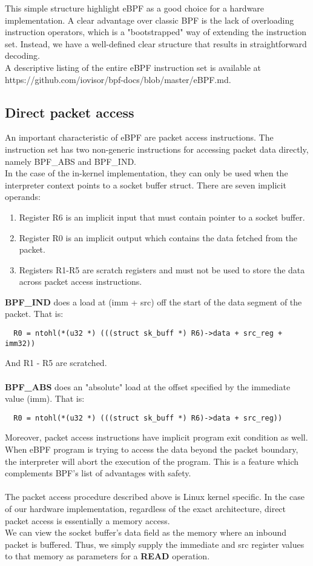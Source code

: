 \documentclass{l4proj}
\begin{document}
This simple structure highlight eBPF as a good choice for a hardware implementation. A clear advantage over classic BPF is the lack of overloading instruction operators, which is a "bootstrapped" way of extending the instruction set. Instead, we have a well-defined clear structure that results in straightforward decoding.\\
A descriptive listing of the entire eBPF instruction set is available at\\ https://github.com/iovisor/bpf-docs/blob/master/eBPF.md.\\

\subsection{Direct packet access}
An important characteristic of eBPF are packet access instructions. The instruction set has two non-generic instructions for accessing packet data directly, namely BPF\_ABS and BPF\_IND.\\
In the case of the in-kernel implementation, they can only be used when the interpreter context points to a socket buffer struct. There are seven implicit operands:
\begin{enumerate}
    \item Register R6 is an implicit input that must contain pointer to a socket buffer.
    \item Register R0 is an implicit output which contains the data fetched from the packet.
    \item Registers R1-R5 are scratch registers and must not be used to store the data across packet access instructions.
\end{enumerate}
\textbf{BPF\_IND} does a load at (imm + src) off the start of the data segment of the packet. That is:
\begin{lstlisting}
  R0 = ntohl(*(u32 *) (((struct sk_buff *) R6)->data + src_reg + imm32))
\end{lstlisting}
And R1 - R5 are scratched.\\\\
\textbf{BPF\_ABS} does an "absolute" load at the offset specified by the immediate value (imm). That is:
\begin{lstlisting}
  R0 = ntohl(*(u32 *) (((struct sk_buff *) R6)->data + src_reg))
\end{lstlisting}
Moreover, packet access instructions have implicit program exit condition as well. When eBPF program is trying to access the data beyond the packet boundary, the interpreter will abort the execution of the program. This is a feature which complements BPF's list of advantages with safety.\\\\
The packet access procedure described above is Linux kernel specific. In the case of our hardware implementation, regardless of the exact architecture, direct packet access is essentially a memory access.\\
We can view the socket buffer's data field as the memory where an inbound packet is buffered. Thus, we simply supply the immediate and src register values to that memory as parameters for a \textbf{READ} operation.
\end{document}
